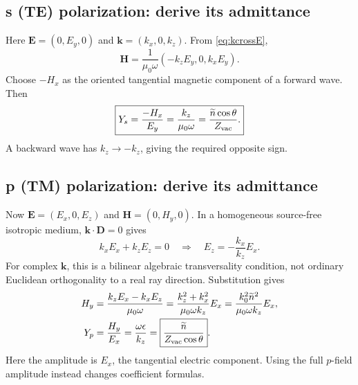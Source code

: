 \subsection{s (TE) polarization: derive its admittance}
Here $\mathbf E=(0,E_y,0)$ and $\mathbf k=(k_x,0,k_z)$. From \eqref{eq:kcrossE},
\begin{equation}
\mathbf H=\frac{1}{\mu_0\omega}(-k_zE_y,0,k_xE_y).
\end{equation}
Choose $-H_x$ as the oriented tangential magnetic component of a forward wave. Then
\begin{equation}
\boxed{Y_s=\frac{-H_x}{E_y}=\frac{k_z}{\mu_0\omega}
=\frac{\widetilde n\cos\theta}{Z_{\rm vac}}.}
\end{equation}
A backward wave has $k_z\to-k_z$, giving the required opposite sign.

\subsection{p (TM) polarization: derive its admittance}
Now $\mathbf E=(E_x,0,E_z)$ and $\mathbf H=(0,H_y,0)$. In a homogeneous source-free isotropic medium, $\mathbf k\cdot\mathbf D=0$ gives
\begin{equation}
k_xE_x+k_zE_z=0\quad\Longrightarrow\quad E_z=-\frac{k_x}{k_z}E_x.
\end{equation}
For complex $\mathbf k$, this is a bilinear algebraic transversality condition, not ordinary Euclidean orthogonality to a real ray direction. Substitution gives
\begin{align}
H_y&=\frac{k_zE_x-k_xE_z}{\mu_0\omega}
=\frac{k_z^2+k_x^2}{\mu_0\omega k_z}E_x
=\frac{k_0^2\widetilde n^2}{\mu_0\omega k_z}E_x,\\
Y_p&=\frac{H_y}{E_x}=\frac{\omega\epsilon}{k_z}
=\boxed{\frac{\widetilde n}{Z_{\rm vac}\cos\theta}}.
\end{align}
Here the amplitude is $E_x$, the tangential electric component. Using the full $p$-field amplitude instead changes coefficient formulas.

